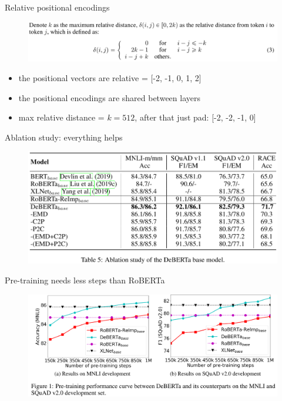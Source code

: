 \documentclass{beamer}
\begin{document}
\begin{frame}{Relative positional encodings}
 
\begin{figure}[h]
\includegraphics[width=\textwidth]{img/reldist}
\end{figure}

\begin{itemize}
\item the positional vectors are relative = [-2, -1, 0, 1, 2]
\item the positional encodings are shared between layers
\item max relative distance = $k=512$, after that just pad: [-2, -2, -1, 0]
\end{itemize}

\end{frame}
\begin{frame}{Ablation study: everything helps}

\begin{figure}[h]
\includegraphics[width=\textwidth]{img/ablation}
\end{figure}

\end{frame}
\begin{frame}{Pre-training needs less steps than RoBERTa}

\begin{figure}[h]
\includegraphics[width=\textwidth]{img/pretraining}
\end{figure}

\end{frame}
\end{document}
